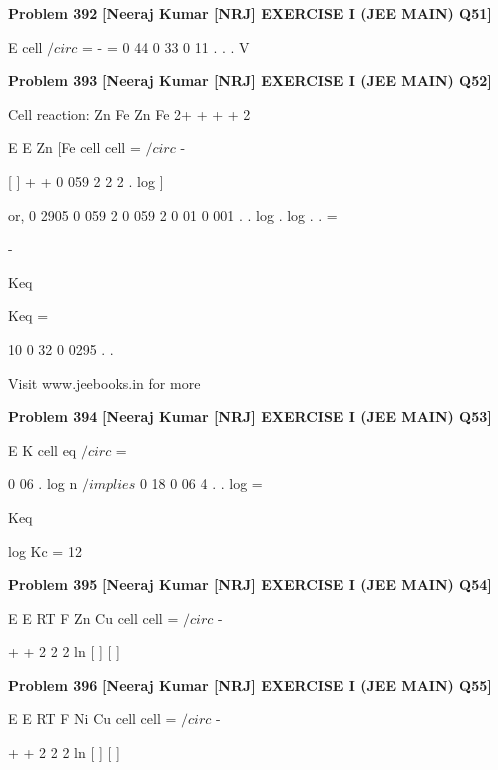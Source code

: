 \begin{problembox}
\textbf{Problem 392} \hfill \textbf{[Neeraj Kumar [NRJ] EXERCISE I (JEE MAIN) Q51]}
\label{q:ext-nrj_all_questions-392}

E cell
$/circ$
=
-
=
0 44
0 33
0 11
.
.
.
V
\end{problembox}

\begin{problembox}
\textbf{Problem 393} \hfill \textbf{[Neeraj Kumar [NRJ] EXERCISE I (JEE MAIN) Q52]}
\label{q:ext-nrj_all_questions-393}

Cell reaction: Zn
Fe
Zn
Fe
2+
+
+
+
2 
  


 



 
 
E
E
Zn
[Fe
cell
cell
=
$/circ$
-
 
[
]
+
+
0 059
2
2
2
.
log
]
 
 or, 0 2905
0 059
2
0 059
2
0 01
0 001
.
.
log
.
log
.
.
=
 
-
 
Keq
 
  Keq =
 
  
 
  
10
0 32
0 0295
.
.
 
 
Visit www.jeebooks.in for more
\end{problembox}

\begin{problembox}
\textbf{Problem 394} \hfill \textbf{[Neeraj Kumar [NRJ] EXERCISE I (JEE MAIN) Q53]}
\label{q:ext-nrj_all_questions-394}

E
K
cell
eq
$/circ$
=
 
0 06
.
log
n
 $/implies$ 0 18
0 06
4
.
.
log
=
 
Keq
 
   log Kc = 12
\end{problembox}

\begin{problembox}
\textbf{Problem 395} \hfill \textbf{[Neeraj Kumar [NRJ] EXERCISE I (JEE MAIN) Q54]}
\label{q:ext-nrj_all_questions-395}

E
E
RT
F
Zn
Cu
cell
cell
=
$/circ$
-
 
+
+
2
2
2
ln [
]
[
]
\end{problembox}

\begin{problembox}
\textbf{Problem 396} \hfill \textbf{[Neeraj Kumar [NRJ] EXERCISE I (JEE MAIN) Q55]}
\label{q:ext-nrj_all_questions-396}

E
E
RT
F
Ni
Cu
cell
cell
=
$/circ$
-
 
+
+
2
2
2
ln [
]
[
]
\end{problembox}

